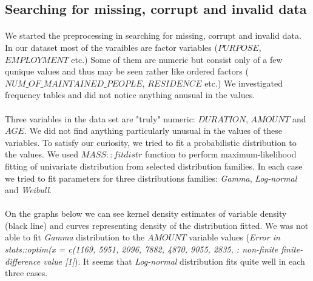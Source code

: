 \documentclass[10pt]{article}\usepackage[]{graphicx}\usepackage[]{color}
\begin{document}
\subsection{Searching for missing, corrupt and invalid data}
\paragraph{}
We started the preprocessing in searching for missing, corrupt and invalid data. In our dataset most of the varaibles are factor variables ($PURPOSE$, $EMPLOYMENT$ etc.) Some of them are numeric but consist only of a few qunique values and thus may be seen rather like ordered factors ($NUM\_OF\_MAINTAINED\_PEOPLE$, $RESIDENCE$ etc.) We investigated frequency tables and did not notice anything anusual in the values. 
\paragraph{}
Three variables in the data set are "truly" numeric: $DURATION$, $AMOUNT$ and $AGE$. We did not find anything particularly unusual in the values of these variables. To satisfy our curiosity, we tried to fit a probabilistic distribution to the values. We used $MASS::fitdistr$ function to perform maximum-likelihood fitting of univariate distribution from selected distribution families. In each case we tried to fit parameters for three distributions families: \textit{Gamma}, \textit{Log-normal} and \textit{Weibull}. 
\paragraph{}
On the graphs below we can see kernel density estimates of variable density (black line) and curves representing density of the distribution fitted. We was not able to fit \textit{Gamma} distribution to the $AMOUNT$ variable values (\textit{Error in stats::optim(x = c(1169, 5951, 2096, 7882, 4870, 9055, 2835,  :  non-finite finite-difference value [1]}). It seems that \textit{Log-normal} distribution fits quite well in each three cases. 
\end{document}
